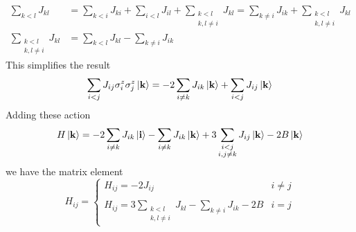 \documentclass[../../../main.tex]{subfiles}
\begin{document}
\begin{align*}
    \sum_{k<l} J_{kl}
     & = \sum_{k<i}J_{ki}+ \sum_{i<l}J_{il}   + \sum_{\substack{k<l \\k,l \neq i}}J_{kl}
    =  \sum_{k \neq i} J_{ik}   + \sum_{\substack{k<l               \\k,l \neq i}}J_{kl}\\
    \sum_{\substack{k<l                                             \\k,l \neq i}}J_{kl}
     & =     \sum_{k<l} J_{kl} -  \sum_{k \neq i} J_{ik}
\end{align*}
This simplifies the result
\begin{equation*}
    \sum_{i<j} J_{ij} \sigma^z_i \sigma^z_j \ket{\mathbf{k}}
    = - 2 \sum_{i \neq k} J_{ik} \ket{\mathbf{k}}  + \sum_{i<j} J_{ij} \ket{\mathbf{k}}
\end{equation*}
Adding these action
\begin{equation*}
    H \ket{\mathbf{k} } =
    -2\sum_{i \neq k}J_{ik}  \ket{\mathbf{i}} - \sum_{i \neq k}  J_{ik}\ket{\mathbf{k}} +3 \sum_{\substack{i<j      \\i,j \neq k}}J_{ij} \ket{\mathbf{k}} -2B\ket{\mathbf{k}}
\end{equation*}
we have the matrix element
\begin{equation*}
    H_{ij} =
    \begin{cases}
        H_{ij} = -2 J_{ij} & i\neq j    \\\\
        H_{ij} =  3 \sum_{\substack{k<l \\k,l \neq i}} J_{kl} - \sum_{k \neq i}  J_{ik} -2B & i=j
    \end{cases}
\end{equation*}
\end{document}

